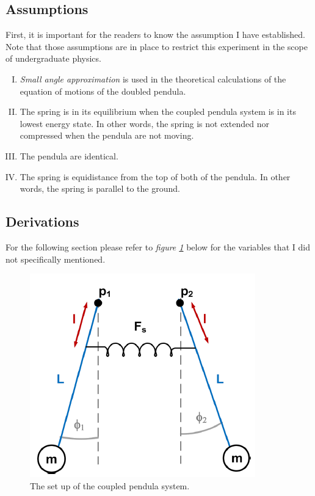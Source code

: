 \documentclass[aps,prl,reprint,10pt,amsmath,amssymb,superscriptaddress,a4paper]{revtex4-2}
\begin{document}
\subsection{Assumptions}
First, it is important for the readers to know the assumption I have established. Note that those assumptions are in place to restrict this experiment in the scope of undergraduate physics.
\begin{enumerate}[I.]
    \item \textit{Small angle approximation} is used in the theoretical calculations of the equation of motions of the doubled pendula. \label{Assumption 1}
    \item The spring is in its equilibrium when the coupled pendula system is in its lowest energy state. In other words, the spring is not extended nor compressed when the pendula are not moving. \label{Assumption 2}
    \item The pendula are identical. \label{Assumption 3}
    \item The spring is equidistance from the top of both of the pendula. In other words, the spring is parallel to the ground. \label{Assumption 4} 
\end{enumerate}

\subsection{Derivations}
For the following section please refer to \textit{figure \ref{fig 1}} below for the variables that I did not specifically mentioned.
\begin{figure}[H]
    \includegraphics[width = 9 cm]{images/coupledpendula set up.png}
    \caption{The set up of the coupled pendula system.\citep{lab_note} \label{fig 1}}
\end{figure}
\end{document}
